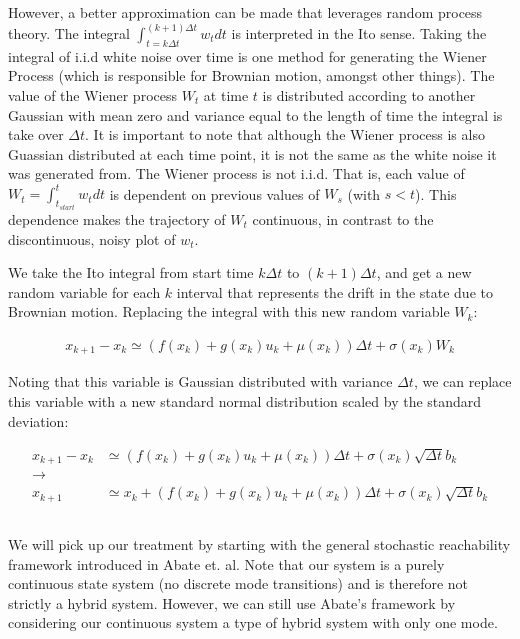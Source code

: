\documentclass[a4paper]{article}
\begin{document}
However, a better approximation can be made that leverages random process theory.
The integral $\int_{t = k \Delta t}^{(k+1) \Delta t} w_t dt$ is interpreted in the Ito sense.
Taking the integral of i.i.d white noise over time is one method for generating the Wiener Process (which is responsible for Brownian motion, amongst other things).
The value of the Wiener process $W_t$ at time $t$ is distributed according to another Gaussian with mean zero and variance equal to the length of time the integral is take over $\Delta t$.
It is important to note that although the Wiener process is also Guassian distributed at each time point, it is not the same as the white noise it was generated from.
The Wiener process is not i.i.d.
That is, each value of $W_t = \int_{t_{start}}^{t} w_t dt$ is dependent on previous values of $W_s$ (with $s<t$).
This dependence makes the trajectory of $W_t$ continuous, in contrast to the discontinuous, noisy plot of $w_t$.

We take the Ito integral from start time $k \Delta t$ to $(k+1) \Delta t$, and get a new random variable for each $k$ interval that represents the drift in the state due to Brownian motion.
Replacing the integral with this new random variable $W_k$:

\begin{align*}
x_{k+1} - x_k \simeq (f(x_k) + g(x_k) u_k + \mu(x_k)) \Delta t + \sigma(x_k) W_k
\end{align*}

Noting that this variable is Gaussian distributed with variance $\Delta t$, we can replace this variable with a new standard normal distribution scaled by the standard deviation:

\begin{align*}
x_{k+1} - x_k &\simeq (f(x_k) + g(x_k) u_k + \mu(x_k)) \Delta t + \sigma(x_k) \sqrt{\Delta t} b_k
\\ \rightarrow &
\\x_{k+1} &\simeq x_k + (f(x_k) + g(x_k) u_k + \mu(x_k)) \Delta t + \sigma(x_k) \sqrt{\Delta t} b_k
\end{align*}

\subsection{}
We will pick up our treatment by starting with the general stochastic reachability framework introduced in Abate et. al. %
Note that our system is a purely continuous state system (no discrete mode transitions) and is therefore not strictly a hybrid system.
However, we can still use Abate's framework by considering our continuous system a type of hybrid system with only one mode.
\end{document}
